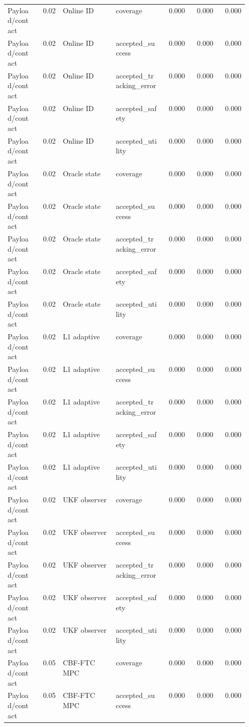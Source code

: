 \documentclass{article}
\begin{document}
\begin{center}
\begin{longtable}{p{0.13\linewidth}rp{0.22\linewidth}p{0.20\linewidth}rrr}
Payload/contact & 0.02 & Online ID & coverage & 0.000 & 0.000 & 0.000\\
Payload/contact & 0.02 & Online ID & accepted\_success & 0.000 & 0.000 & 0.000\\
Payload/contact & 0.02 & Online ID & accepted\_tracking\_error & 0.000 & 0.000 & 0.000\\
Payload/contact & 0.02 & Online ID & accepted\_safety & 0.000 & 0.000 & 0.000\\
Payload/contact & 0.02 & Online ID & accepted\_utility & 0.000 & 0.000 & 0.000\\
Payload/contact & 0.02 & Oracle state & coverage & 0.000 & 0.000 & 0.000\\
Payload/contact & 0.02 & Oracle state & accepted\_success & 0.000 & 0.000 & 0.000\\
Payload/contact & 0.02 & Oracle state & accepted\_tracking\_error & 0.000 & 0.000 & 0.000\\
Payload/contact & 0.02 & Oracle state & accepted\_safety & 0.000 & 0.000 & 0.000\\
Payload/contact & 0.02 & Oracle state & accepted\_utility & 0.000 & 0.000 & 0.000\\
Payload/contact & 0.02 & L1 adaptive & coverage & 0.000 & 0.000 & 0.000\\
Payload/contact & 0.02 & L1 adaptive & accepted\_success & 0.000 & 0.000 & 0.000\\
Payload/contact & 0.02 & L1 adaptive & accepted\_tracking\_error & 0.000 & 0.000 & 0.000\\
Payload/contact & 0.02 & L1 adaptive & accepted\_safety & 0.000 & 0.000 & 0.000\\
Payload/contact & 0.02 & L1 adaptive & accepted\_utility & 0.000 & 0.000 & 0.000\\
Payload/contact & 0.02 & UKF observer & coverage & 0.000 & 0.000 & 0.000\\
Payload/contact & 0.02 & UKF observer & accepted\_success & 0.000 & 0.000 & 0.000\\
Payload/contact & 0.02 & UKF observer & accepted\_tracking\_error & 0.000 & 0.000 & 0.000\\
Payload/contact & 0.02 & UKF observer & accepted\_safety & 0.000 & 0.000 & 0.000\\
Payload/contact & 0.02 & UKF observer & accepted\_utility & 0.000 & 0.000 & 0.000\\
Payload/contact & 0.05 & CBF-FTC MPC & coverage & 0.000 & 0.000 & 0.000\\
Payload/contact & 0.05 & CBF-FTC MPC & accepted\_success & 0.000 & 0.000 & 0.000\\

\end{longtable}
\end{center}
\end{document}
